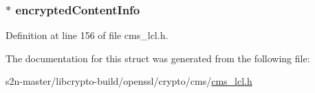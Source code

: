 \subsubsection[{\texorpdfstring{encrypted\+Content\+Info}{encryptedContentInfo}}]{$\ast$ encrypted\+Content\+Info}\hypertarget{struct_c_m_s___enveloped_data__st_ad4da71b66cde0fa01706c19ae122dc53}{}\label{struct_c_m_s___enveloped_data__st_ad4da71b66cde0fa01706c19ae122dc53}


Definition at line 156 of file cms\+\_\+lcl.\+h.



The documentation for this struct was generated from the following file\+:\begin{DoxyCompactItemize}
\item 
s2n-\/master/libcrypto-\/build/openssl/crypto/cms/\hyperlink{cms__lcl_8h}{cms\+\_\+lcl.\+h}\end{DoxyCompactItemize}
